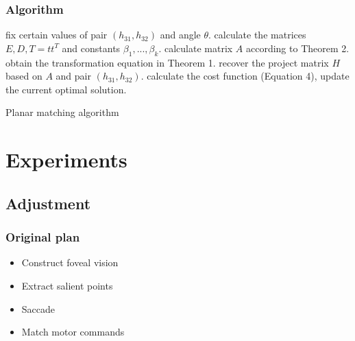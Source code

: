\documentclass{beamer}
\begin{document}
\begin{frame}
\frametitle{Algorithm}

\begin{algorithm}[H]
\begin{algorithmic}
\LOOP
\STATE fix certain values of pair $(h_{31},h_{32})$ and angle $\theta$.
\STATE calculate the matrices $E,D,T=tt^T$ and constants $\beta_1,...,\beta_k$.
\STATE calculate matrix $A$ according to Theorem 2.
\STATE obtain the transformation equation in Theorem 1.
\STATE recover the project matrix $H$ based on $A$ and pair $(h_{31},h_{32})$.
\STATE calculate the cost function (Equation 4), update the current optimal solution.
\ENDLOOP
{}
\end{algorithmic}
\caption{Planar matching algorithm}
\label{alg:seq}
\end{algorithm}


\end{frame}


\section{Experiments}


\subsection{Adjustment}
\begin{frame}
\frametitle{Original plan}
\begin{itemize}
\item Construct foveal vision%
\item Extract salient points%
\item Saccade%
\item Match motor commands%
\end{itemize}
\end{frame}
\end{document}

